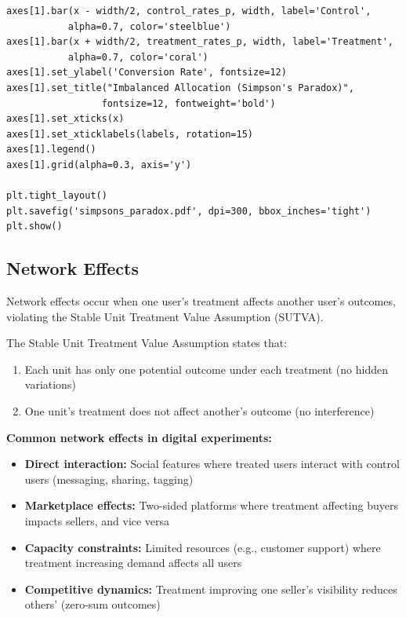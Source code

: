\begin{lstlisting}
axes[1].bar(x - width/2, control_rates_p, width, label='Control',
           alpha=0.7, color='steelblue')
axes[1].bar(x + width/2, treatment_rates_p, width, label='Treatment',
           alpha=0.7, color='coral')
axes[1].set_ylabel('Conversion Rate', fontsize=12)
axes[1].set_title("Imbalanced Allocation (Simpson's Paradox)",
                 fontsize=12, fontweight='bold')
axes[1].set_xticks(x)
axes[1].set_xticklabels(labels, rotation=15)
axes[1].legend()
axes[1].grid(alpha=0.3, axis='y')

plt.tight_layout()
plt.savefig('simpsons_paradox.pdf', dpi=300, bbox_inches='tight')
plt.show()
\end{lstlisting}

\subsection{Network Effects}

Network effects occur when one user's treatment affects another user's outcomes, violating the Stable Unit Treatment Value Assumption (SUTVA).

\begin{definition}[SUTVA]
The Stable Unit Treatment Value Assumption states that:
\begin{enumerate}
    \item Each unit has only one potential outcome under each treatment (no hidden variations)
    \item One unit's treatment does not affect another's outcome (no interference)
\end{enumerate}
\end{definition}

\textbf{Common network effects in digital experiments:}

\begin{itemize}
    \item \textbf{Direct interaction:} Social features where treated users interact with control users (messaging, sharing, tagging)

    \item \textbf{Marketplace effects:} Two-sided platforms where treatment affecting buyers impacts sellers, and vice versa

    \item \textbf{Capacity constraints:} Limited resources (e.g., customer support) where treatment increasing demand affects all users

    \item \textbf{Competitive dynamics:} Treatment improving one seller's visibility reduces others' (zero-sum outcomes)
\end{itemize}

